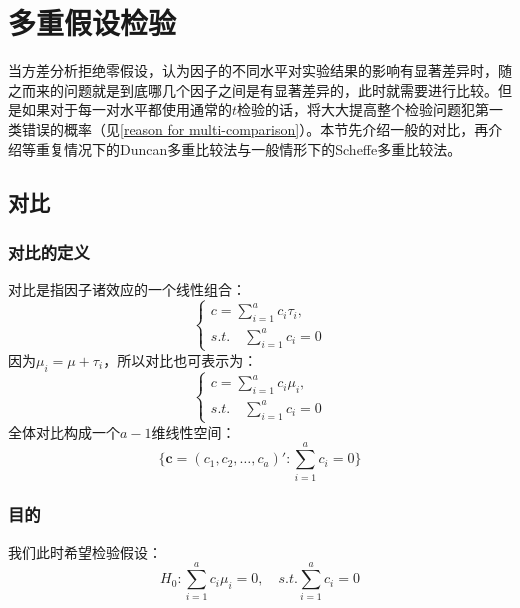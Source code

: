 \section{多重假设检验}
当方差分析拒绝零假设，认为因子的不同水平对实验结果的影响有显著差异时，随之而来的问题就是到底哪几个因子之间是有显著差异的，此时就需要进行比较。但是如果对于每一对水平都使用通常的$t$检验的话，将大大提高整个检验问题犯第一类错误的概率（见\cref{reason for multi-comparison}）。本节先介绍一般的对比，再介绍等重复情况下的Duncan多重比较法与一般情形下的Scheffe多重比较法。

\subsection{对比}
\subsubsection{对比的定义}
\begin{definition}
	对比是指因子诸效应的一个线性组合：
	\begin{equation*}
		\begin{cases}
			c=\sum\limits_{i=1}^ac_i\tau_i,\\
			s.t.\quad\sum\limits_{i=1}^ac_i=0
		\end{cases}
	\end{equation*}
	因为$\mu_i=\mu+\tau_i$，所以对比也可表示为：
	\begin{equation*}
		\begin{cases}
			c=\sum\limits_{i=1}^ac_i\mu_i,\\
			s.t.\quad\sum\limits_{i=1}^ac_i=0
		\end{cases}
	\end{equation*}
	全体对比构成一个$a-1$维线性空间：
	\begin{equation*}
		\{\mathbf{c}=(c_1,c_2,\dots,c_a)':\sum_{i=1}^ac_i=0\}
	\end{equation*}
\end{definition}
\subsubsection{目的}
我们此时希望检验假设：
\begin{equation*}
	H_0:\sum_{i=1}^ac_i\mu_i=0,\quad s.t.\sum_{i=1}^ac_i=0
\end{equation*}
